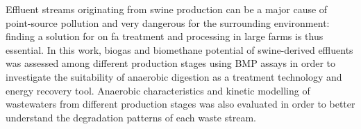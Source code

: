 Effluent streams originating from swine production can be a major cause of point-source pollution and very dangerous for the surrounding environment: finding a solution for on fa treatment and processing in large farms is thus essential. In this work, biogas and biomethane potential of swine-derived effluents was assessed among different production stages using BMP assays in order to investigate the suitability of anaerobic digestion as a treatment technology and energy recovery tool. Anaerobic characteristics and kinetic modelling of wastewaters from different production stages was also evaluated in order to better understand the degradation patterns of each waste stream.
